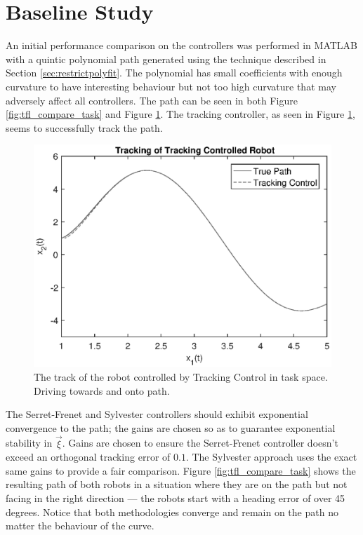 \documentclass[oneside, 11pt]{book}
\begin{document}
\section{Baseline Study}
An initial performance comparison on the controllers was performed in MATLAB with a quintic polynomial path generated using the technique described in Section \ref{sec:restrictpolyfit}. The polynomial has small coefficients with enough curvature to have interesting behaviour but not too high curvature that may adversely affect all controllers. The path can be seen in both Figure \ref{fig:tfl_compare_task} and Figure \ref{fig:track}. The tracking controller, as seen in Figure \ref{fig:track}, seems to successfully track the path.
\begin{figure}[H]
    \centering
    \includegraphics{images/tracking_control.eps}
    \caption{The track of the robot controlled by Tracking Control in task space. Driving towards and onto path.}
    \label{fig:track}
\end{figure}

The Serret-Frenet and Sylvester controllers should exhibit exponential convergence to the path; the gains are chosen so as to guarantee exponential stability in $\vec{\xi}$. Gains are chosen to ensure the Serret-Frenet controller doesn't exceed an orthogonal tracking error of $0.1$. The Sylvester approach uses the exact same gains to provide a fair comparison. Figure \ref{fig:tfl_compare_task} shows the resulting path of both robots in a situation where they are on the path but not facing in the right direction --- the robots start with a heading error of over 45 degrees. Notice that both methodologies converge and remain on the path no matter the behaviour of the curve.
\end{document}
